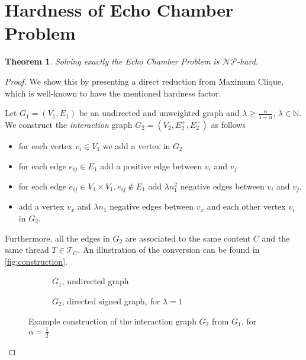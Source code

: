 \documentclass{article}
\newtheorem{theorem}{Theorem}
\begin{document}
\section*{Hardness of Echo Chamber Problem}%
\label{sec:np_hardness_of_echo_chamber_problem}

\begin{theorem}
	\label{th:hardness}
	Solving exactly the Echo Chamber Problem is $\mathcal{NP}$-hard.
\end{theorem}

\begin{proof}
	We show this by presenting a direct reduction from Maximum Clique, which is
	well-known to have the mentioned hardness factor.

	\bigskip
	Let $G_{1}  = (V_{1} ,E_{1} )$ be an undirected and unweighted graph and
	$\lambda \geq \frac{\alpha }{1 - \alpha }$, $\lambda \in \mathbb{N}$.
	We construct the \emph{interaction} graph ${G}_{2}  = (V_{2} , E^{+}_{2} , E
			^{-}_{2} ) $ as follows

	\begin{itemize}
		\item for each vertex $v_{i}  \in V_{1} $ we add a vertex in $G_{2} $
		\item for each edge $e_{ij}  \in
			      E_{1} $ add a positive edge between $v_{i} $ and $v_{j} $
		\item for each edge $e_{ij} \in V_{1} \times V_{1}, e_{ij}  \not\in
			      E_{1} $ add $\lambda n^{2}_{1}  $ negative edges between $v_{i} $ and $v_{j} $.
		\item add a vertex $v_x$ and $\lambda n_{1} $ negative edges between $v_x$
		      and each other vertex $v_i$ in $G_2$.
	\end{itemize}

	Furthermore, all the edges in $G_{2} $ are associated to the same content
	$C$ and the same thread $T \in \mathcal{T}_{C}  $.
	An illustration of the conversion can be found in \autoref{fig:construction}.

	\begin{figure}[hbt]
		\begin{center}
			\begin{subfigure}[b]{0.4\textwidth}
				\centering
				\caption{$G_{1}$, undirected graph}
				\label{fig:g1_example}
			\end{subfigure}
			\begin{subfigure}[b]{0.4\textwidth}
				\centering
				\caption{$G_{2}$, directed signed graph, for $\lambda = 1$}
				\label{fig:g2_example}
			\end{subfigure}
		\end{center}
		\caption{Example construction of the interaction graph $G_{2} $ from
			$G_{1} $, for $\alpha = \frac{1}{2} $}
		\label{fig:construction}
	\end{figure}


\end{proof}
\end{document}
